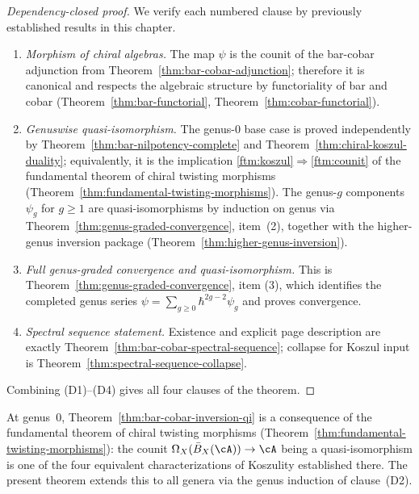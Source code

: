 \begin{proof}[Dependency-closed proof]
We verify each numbered clause by previously established results in this chapter.
\begin{enumerate}[label=(D\arabic*)]
\item \emph{Morphism of chiral algebras.}
The map $\psi$ is the counit of the bar-cobar adjunction from
Theorem~\ref{thm:bar-cobar-adjunction}; therefore it is canonical and respects
the algebraic structure by functoriality of bar and cobar
(Theorem~\ref{thm:bar-functorial}, Theorem~\ref{thm:cobar-functorial}).

\item \emph{Genuswise quasi-isomorphism.}
The genus-$0$ base case is proved independently by
Theorem~\ref{thm:bar-nilpotency-complete} and
Theorem~\ref{thm:chiral-koszul-duality};
equivalently, it is the implication
\ref{ftm:koszul}$\Rightarrow$\ref{ftm:counit} of
the fundamental theorem of chiral twisting morphisms
(Theorem~\ref{thm:fundamental-twisting-morphisms}).
The genus-$g$ components $\psi_g$ for $g \geq 1$ are quasi-isomorphisms by
induction on genus via
Theorem~\ref{thm:genus-graded-convergence}, item~(2), together with the
higher-genus inversion package (Theorem~\ref{thm:higher-genus-inversion}).

\item \emph{Full genus-graded convergence and quasi-isomorphism.}
This is Theorem~\ref{thm:genus-graded-convergence}, item (3), which identifies
the completed genus series $\psi=\sum_{g\ge 0}\hbar^{2g-2}\psi_g$ and proves convergence.

\item \emph{Spectral sequence statement.}
Existence and explicit page description are exactly
Theorem~\ref{thm:bar-cobar-spectral-sequence}; collapse for Koszul input is
Theorem~\ref{thm:spectral-sequence-collapse}.
\end{enumerate}
Combining (D1)--(D4) gives all four clauses of the theorem.
\end{proof}

\begin{remark}
\label{rem:inversion-vs-fundamental}
At genus~$0$, Theorem~\ref{thm:bar-cobar-inversion-qi} is a
consequence of the fundamental theorem of chiral twisting morphisms
(Theorem~\ref{thm:fundamental-twisting-morphisms}):
the counit $\Omega_X(\bar{B}_X(\cA)) \to \cA$ being a
quasi-isomorphism is one of the four equivalent characterizations
of Koszulity established there.  The present theorem extends this
to all genera via the genus induction of clause~(D2).
\end{remark}

